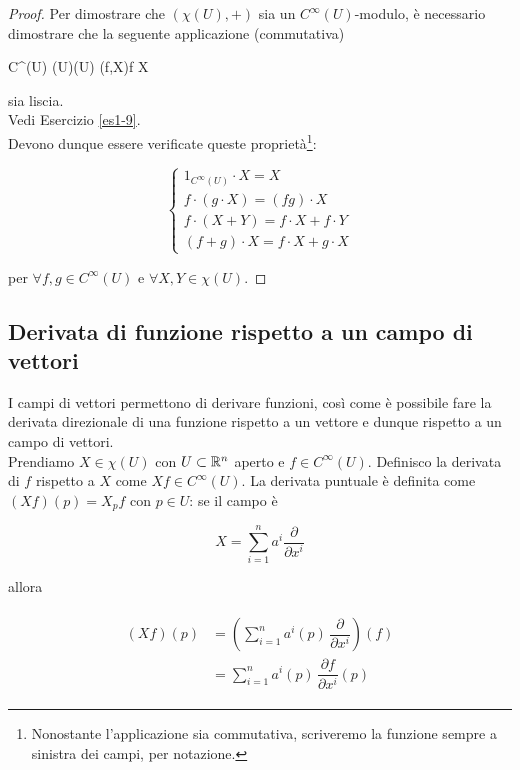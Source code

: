 \begin{proof}
	Per dimostrare che $ (\chi(U),+) $ sia un $ C^{\infty}(U) $-modulo, è necessario dimostrare che la seguente applicazione (commutativa)
	
		{C^{\infty}(U) \times \chi(U)}{\chi(U)}%
		{(f,X)}{f X}

	sia liscia.\\
	Vedi Esercizio \ref{es1-9}.\\
	Devono dunque essere verificate queste proprietà\footnote{%
		Nonostante l'applicazione sia commutativa, scriveremo la funzione sempre a sinistra dei campi, per notazione.%
	}:

	\begin{equation}
		\begin{cases}
			1_{C^{\infty}(U)} \cdot X = X\\
			f \cdot (g \cdot X) = (f g) \cdot X\\
			f \cdot (X+Y) = f \cdot X + f \cdot Y\\
			(f+g) \cdot X = f \cdot X + g \cdot X
		\end{cases}
	\end{equation}

	per $ \forall f,g \in C^{\infty}(U) $ e $ \forall X,Y \in \chi(U) $.
\end{proof}

\subsection{Derivata di funzione rispetto a un campo di vettori} 

I campi di vettori permettono di derivare funzioni, così come è possibile fare la derivata direzionale di una funzione rispetto a un vettore e dunque rispetto a un campo di vettori.\\
Prendiamo $ X \in \chi(U) $ con $ U \subset \mathbb{R}^{n} $ aperto e $ f \in C^{\infty}(U) $. Definisco la derivata di $ f $ rispetto a $ X $ come $ X f \in C^{\infty}(U) $. La derivata puntuale è definita come $ (X f) (p) = X_{p} f $ con $ p \in U $: se il campo è

\begin{equation}
	X = \sum_{i=1}^{n} a^{i} \dfrac{\partial}{\partial x^{i}}
\end{equation}

allora

\begin{align}
	\begin{split}
		(X f) (p) &= \left( \sum_{i=1}^{n} a^{i}(p) \, \dfrac{\partial}{\partial x^{i}} \right) (f)\\
		&= \sum_{i=1}^{n} a^{i}(p) \, \dfrac{\partial f}{\partial x^{i}} (p)
	\end{split}
\end{align}

